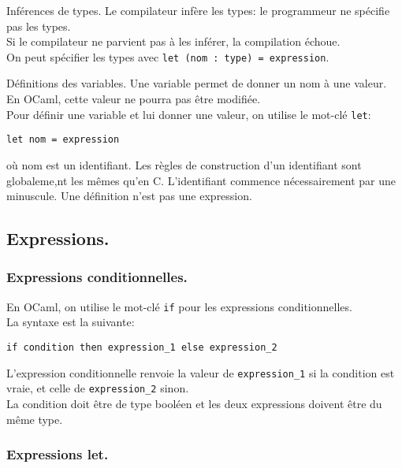 \documentclass[french, 11pt]{article}
\begin{document}
\begin{defi}{Inférences de types.}{}
    Le compilateur infère les types: le programmeur ne spécifie pas les types.\\
    Si le compilateur ne parvient pas à les inférer, la compilation échoue.\\
    On peut spécifier les types avec \texttt{let (nom : type) = expression}.
\end{defi}

\begin{defi}{Définitions des variables.}{}
    Une variable permet de donner un nom à une valeur. En OCaml, cette valeur ne pourra pas être modifiée.\\
    Pour définir une variable et lui donner une valeur, on utilise le mot-clé \texttt{let}:
    \begin{center}
        \texttt{let nom = expression}
    \end{center}
    où nom est un identifiant. Les règles de construction d'un identifiant sont globaleme,nt les mêmes qu'en C. L'identifiant commence nécessairement par une minuscule.\n
    Une définition n'est pas une expression. 
\end{defi}

\subsection{Expressions.}

\subsubsection{Expressions conditionnelles.}

\begin{defi}{}{}
    En OCaml, on utilise le mot-clé \texttt{if} pour les expressions conditionnelles.\\
    La syntaxe est la suivante:
    \begin{center}
        \texttt{if condition then expression\_1 else expression\_2}
    \end{center}
    L'expression conditionnelle renvoie la valeur de \texttt{expression\_1} si la condition est vraie, et celle de \texttt{expression\_2} sinon.\\
    La condition doit être de type booléen et les deux expressions doivent être du même type.
\end{defi}

\subsubsection{Expressions let.}
\end{document}
